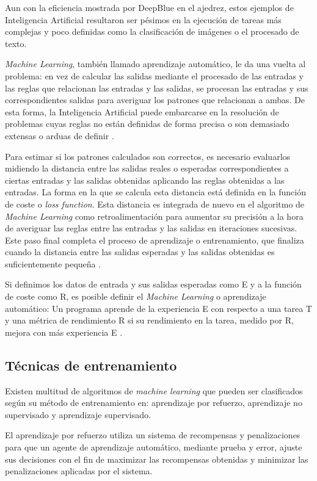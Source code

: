 Aun con la eficiencia mostrada por DeepBlue en el ajedrez, estos ejemplos de Inteligencia Artificial resultaron ser pésimos en la ejecución de tareas más complejas y poco definidas como la clasificación de imágenes o el procesado de texto.

\textit{Machine Learning}, también llamado aprendizaje automático, le da una vuelta al problema: en vez de calcular las salidas mediante el procesado de las entradas y las reglas que relacionan las entradas y las salidas, se procesan las entradas y sus correspondientes salidas para averiguar los patrones que relacionan a ambas. De esta forma, la Inteligencia Artificial puede embarcarse en la resolución de problemas cuyas reglas no están definidas de forma precisa o son demasiado extensas o arduas de definir \cite{deeplearning, machinelearningbook1}.

Para estimar si los patrones calculados son correctos, es necesario evaluarlos midiendo la distancia entre las salidas reales o esperadas correspondientes a ciertas entradas y las salidas obtenidas aplicando las reglas obtenidas a las entradas. La forma en la que se calcula esta distancia está definida en la función de coste o \textit{loss function}. Esta distancia es integrada de nuevo en el algoritmo de \textit{Machine Learning} como retroalimentación para aumentar su precisión a la hora de averiguar las reglas entre las entradas y las salidas en iteraciones sucesivas. Este paso final completa el proceso de aprendizaje o entrenamiento, que finaliza cuando la distancia entre las salidas esperadas y las salidas obtenidas es suficientemente pequeña \cite{rumelhart1985}.

Si definimos los datos de entrada y sus salidas esperadas como E y a la función de coste como R, es posible definir el \textit{Machine Learning} o aprendizaje automático: Un programa aprende de la experiencia E con respecto a una tarea T y una métrica de rendimiento R si su rendimiento en la tarea, medido por R, mejora con más experiencia E \cite{samuel1959, deeplearning}.

\subsection{Técnicas de entrenamiento}
Existen multitud de algoritmos de \textit{machine learning} que pueden ser clasificados según su método de entrenamiento en: aprendizaje por refuerzo, aprendizaje no supervisado y aprendizaje supervisado.

El aprendizaje por refuerzo utiliza un sistema de recompensas y penalizaciones para que un agente de aprendizaje automático, mediante prueba y error, ajuste sus decisiones con el fin de maximizar las recompensas obtenidas y minimizar las penalizaciones aplicadas por el sistema. 

